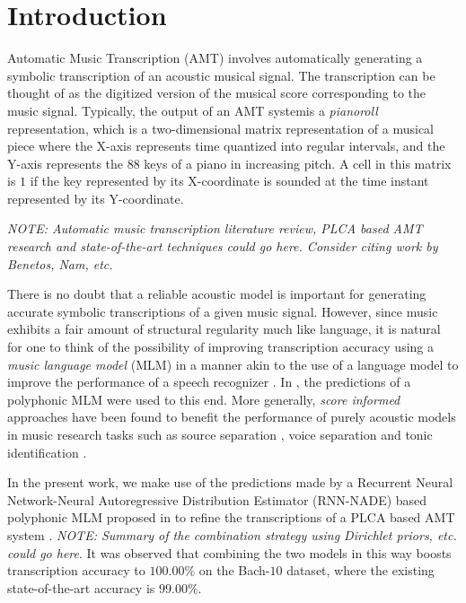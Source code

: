 \section{Introduction} 
\label{sec:introduction}

Automatic Music Transcription (AMT) involves automatically generating a symbolic transcription of an acoustic musical signal. The transcription can be thought of as the digitized version of the musical score corresponding to the music signal. Typically, the output of an AMT systemis a \textit{pianoroll} representation, which is a two-dimensional matrix representation of a musical piece where the X-axis represents time quantized into regular intervals, and the Y-axis represents the $88$ keys of a piano in increasing pitch. A cell in this matrix is $1$ if the key represented by its X-coordinate is sounded at the time instant represented by its Y-coordinate.

\textit{NOTE: Automatic music transcription literature review, PLCA based AMT research and state-of-the-art techniques could go here. Consider citing work by Benetos, Nam, etc.}

There is no doubt that a reliable acoustic model is important for generating accurate symbolic transcriptions of a given music signal. %
However, since music exhibits a fair amount of structural regularity much like language, it is natural for one to think of the possibility of improving transcription accuracy using a \textit{music language model} (MLM) in a manner akin to the use of a language model to improve the performance of a speech recognizer \cite{Rabiner1993}. In \cite{Boulanger-Lewandowski2012}, the predictions of a polyphonic MLM were used to this end. More generally, \textit{score informed} approaches have been found to benefit the performance of purely acoustic models in music research tasks such as source separation \cite{Ewert2012}, voice separation \cite{Ewert2011} and tonic identification \cite{Senturk2013}. %

In the present work, we make use of the predictions made by a Recurrent Neural Network-Neural Autoregressive Distribution Estimator (RNN-NADE) based polyphonic MLM proposed in \cite{Boulanger-Lewandowski2012} to refine the transcriptions of a PLCA based AMT system \cite{Benetos2012, Benetos2013}. \textit{NOTE: Summary of the combination strategy using Dirichlet priors, etc. could go here}. It was observed that combining the two models in this way boosts transcription accuracy to $100.00\%$ on the Bach-$10$ dataset, where the existing state-of-the-art accuracy is $99.00\%$.